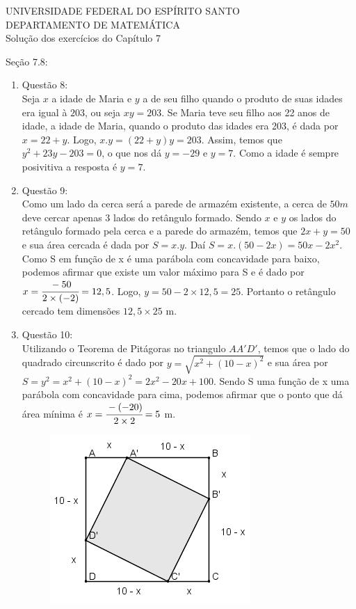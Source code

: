 \documentclass[a4paper]{report}
\begin{document}
\begin{center}
UNIVERSIDADE FEDERAL DO ESPÍRITO SANTO\\DEPARTAMENTO DE MATEMÁTICA\\
\vspace{0.6cm}
Solução dos exercícios do Capítulo 7
\vspace{0.2cm}

\end{center}
Seção 7.8:
\begin{enumerate}
		\item Questão 8:\\Seja $x$ a idade de Maria e $y$ a de seu filho quando o produto de suas idades era igual à $203$, ou seja $xy=203$. Se Maria teve seu filho aos 22 anos de idade, a idade de Maria, quando o produto das idades era 203, é dada por $x = 22 + y$. Logo, $x.y = (22 + y)y = 203$. Assim, temos que $y^2 + 23y - 203 = 0$, o que nos dá $y = -29$ e $y = 7$. Como a idade é sempre posivitiva a resposta é $y = 7$.
		
		\item Questão 9:\\Como um lado da cerca será a parede de armazém existente, a cerca de $50 m$ deve cercar apenas $3$ lados do retângulo formado. Sendo $x$ e $y$ os lados do retângulo formado pela cerca e a parede do armazém, temos que $2x+y=50$ e sua área cercada é dada por $S = x.y$. Daí $S = x.(50 - 2x) = 50x - 2x^2$. Como S em função de x é uma parábola com concavidade para baixo, podemos afirmar que existe um valor máximo para S e é dado por $x=\cfrac{-50}{2\times(-2)} = 12,5$. Logo, $y = 50 - 2\times12,5 = 25$. Portanto o retângulo cercado tem dimensões $12,5\times 25$ m.

		\item Questão 10:\\Utilizando o Teorema de Pitágoras no triangulo $AA'D'$, temos que o lado do quadrado circunscrito é dado por $y=\sqrt{x^2+ (10-x)^2}$ e sua área por $S = y^2 = x^2+ (10-x)^2 = 2x^2-20x+100$. Sendo S uma função de x uma parábola com concavidade para cima, podemos afirmar que o ponto que dá área mínima é $x=\cfrac{-(-20)}{2\times2}=5$ m.
		
		{
			\begin{figure}[!th]
				\centering
			 	\includegraphics[height=0.3\linewidth]{q10.png}
			\end{figure}
		}	


\end{enumerate}
\end{document}
